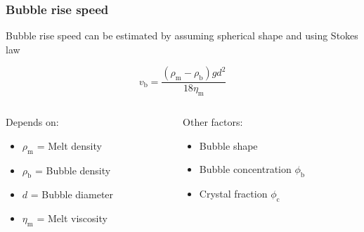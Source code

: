 \documentclass{beamer}
\begin{document}
\begin{frame}
  \frametitle{Bubble rise speed}

  Bubble rise speed can be estimated by assuming spherical shape and using Stokes law

  $$ v_{\text{b}} = \frac{(\rho_{\text{m}} - \rho_{\text{b}}) g d^{2}}{18 \eta_{\text{m}}}$$

  \begin{columns}[t]

    \begin{column}{0.5\paperwidth}

      Depends on:
      \begin{itemize}
      \item $\rho_{\text{m}}$ = Melt density \\
      \item $\rho_{\text{b}}$ = Bubble density \\
      \item $d$ = Bubble diameter \\
      \item $\eta_{\text{m}}$ = Melt viscosity \\
      \end{itemize}

    \end{column}

    \begin{column}{0.5\paperwidth}

      Other factors:
      \begin{itemize}
      \item Bubble shape \\
      \item Bubble concentration $\phi_{\text{b}}$ \\
      \item Crystal fraction $\phi_{\text{c}}$ \\
      \end{itemize}

    \end{column}

  \end{columns}
  
\end{frame}
\end{document}
